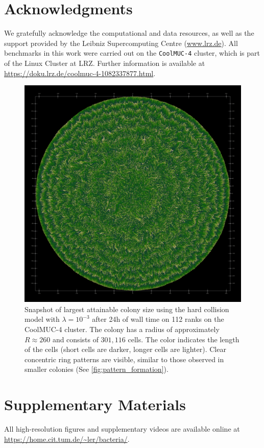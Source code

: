 \documentclass[conference]{IEEEtran}
\begin{document}
\section*{Acknowledgments}

We gratefully acknowledge the computational and data resources, as well as the support provided by the Leibniz Supercomputing Centre (\url{www.lrz.de}). All benchmarks in this work were carried out on the \texttt{CoolMUC-4} cluster, which is part of the Linux Cluster at LRZ. Further information is available at \url{https://doku.lrz.de/coolmuc-4-1082337877.html}.


\newpage

\balance


\newpage
\nobalance


\onecolumn

\appendix
\renewcommand{\thefigure}{A\arabic{figure}}
\renewcommand{\thetable}{A.\arabic{table}}
\setcounter{figure}{0}
\setcounter{table}{0}

\begin{figure}[h]
    \centering
    \includegraphics[width=1\linewidth]{figures/huge/huge_hard.jpeg}

    \caption{Snapshot of largest attainable colony size using the hard collision model with $\lambda=10^{-3}$ after 24h of wall time on 112 ranks on the CoolMUC-4 cluster. The colony has a radius of approximately $R \approx 260$ and consists of $301{,}116$ cells. The color indicates the length of the cells (short cells are darker, longer cells are lighter). Clear concentric ring patterns are visible, similar to those observed in smaller colonies (See \autoref{fig:pattern_formation}).}
    \label{fig:huge_colony_hard}
\end{figure}

\section*{Supplementary Materials}

All high-resolution figures and supplementary videos are available online at \url{https://home.cit.tum.de/~ler/bacteria/}.
\end{document}
